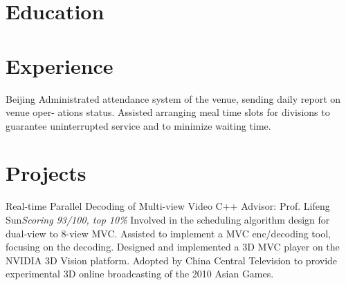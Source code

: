 \documentclass[11pt,a4paper]{moderncv/moderncv}
\begin{document}
\maketitle

\section{Education}


\section{Experience}
{Beijing}{}
{
Administrated attendance system of the venue, sending daily report on venue oper- ations status.
Assisted arranging meal time slots for divisions to guarantee uninterrupted service and to minimize waiting time.
}


\section{Projects}

{Real-time Parallel Decoding of Multi-view Video}
{C++}
{Advisor: Prof. Lifeng Sun}{\textit{Scoring 93/100, top 10\%}}
{
Involved in the scheduling algorithm design for dual-view to 8-view MVC.
Assisted to implement a MVC enc/decoding tool, focusing on the decoding.
Designed and implemented a 3D MVC player on the NVIDIA 3D Vision platform.
Adopted by China Central Television to provide experimental 3D online broadcasting of the 2010 Asian Games.
}
\end{document}

